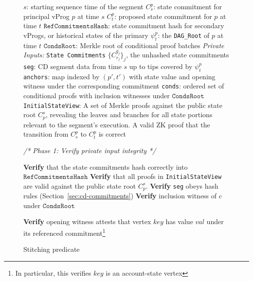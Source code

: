 \documentclass[onecolumn, 9pt, a4paper]{extarticle}
\begin{document}
\newpage
\begin{figure*}[!t]
\begin{whitebgbox}
\begin{algorithm}[H]
\caption{Stitching predicate}\label{alg:stitching}
\begin{algorithmic}[1]
\Require
    \State $s$: starting sequence time of the segment
    \State $C_{s}^{p}$: state commitment for principal vProg $p$ at time $s$
    \State $C_{t}^{p}$: proposed state commitment for $p$ at time $t$
    \State $\texttt{RefCommitmentsHash}$: state commitment hash for secondary vProgs, or historical states of the primary
    \State $\psi_{t}^{p}$: the \texttt{DAG\_Root} of $p$ at time $t$
    \State $\texttt{CondsRoot}$: Merkle root of conditional proof batches
    \State \textit{Private Inputs:}
    \State \quad \texttt{State Commitments} $\{C_{r_j}^{q_j}\}_j$, the unhashed state commitments
    \State \quad \texttt{seg}: CD segment data from time $s$ up to tips covered by $\psi_{t}^{p}$
    \State \quad \texttt{anchors}: map indexed by $(p',t')$ with state value and opening witness under the corresponding commitment
    \State \quad \texttt{conds}: ordered set of conditional proofs with inclusion witnesses under $\texttt{CondsRoot}$
    \State \quad \texttt{InitialStateView}: A set of Merkle proofs against the public state root $C_p^s$, revealing the leaves and branches for all state portions relevant to the segment's execution.
\Ensure
    \State A valid ZK proof that the transition from $C_{s}^{p}$ to $C_{t}^{p}$ is correct

    \vspace{0.5em}
    \Statex \textit{ /* Phase 1: Verify private input integrity */}
    
    \State \textbf{Verify} that the state commitments hash correctly into $\texttt{RefCommitmentsHash}$
    \State \textbf{Verify} that all proofs in \texttt{InitialStateView} are valid against the public state root $C_p^s$.
    \State \textbf{Verify} \texttt{seg} obeys hash rules (Section~\ref{sec:cd-commitments}) 
        \State \textbf{Verify} inclusion witness of $c$ under $\texttt{CondsRoot}$
    \EndFor
    
     
        \State \textbf{Verify} opening witness attests that vertex $key$ has value $val$ under its referenced commitment\footnote{In particular, this verifies $key$ is an account-state vertex }
    \EndFor


\end{algorithmic}
\end{algorithm}
\end{whitebgbox}
\end{figure*}
\end{document}
